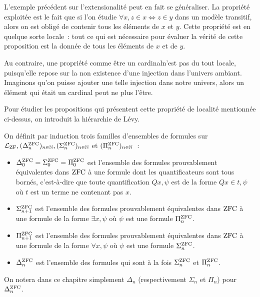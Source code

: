 L'exemple précédent sur l'extensionalité peut en fait se généraliser. La
propriété exploitée est le fait que si l'on étudie
$\forall x, z \in x \iff z \in y$ dans un modèle transitif, alors on est obligé
de contenir tous les éléments de $x$ et $y$. Cette propriété est en quelque
sorte locale~: tout ce qui est nécessaire pour évaluer la vérité de cette
proposition est la donnée de tous les éléments de $x$ et de $y$.

Au contraire, une propriété comme \og être un cardinal\fg n'est pas du tout
locale, puisqu'elle repose sur la non existence d'une injection dans l'univers
ambiant. Imaginons qu'on puisse ajouter une telle injection dans notre univers,
alors un élément qui était un cardinal peut ne plus l'être.

Pour étudier les propositions qui présentent cette propriété de localité
mentionnée ci-dessus, on introduit la hiérarchie de Lévy.

\begin{definition}
  On définit par induction trois familles d'ensembles de formules sur
  $\mathcal L_{\operatorname{ZF}}, (\Delta^{\operatorname{ZFC}}_n)_{n\in\mathbb N},
  (\Sigma^{\operatorname{ZFC}}_n)_{n\in\mathbb N}$
  et $(\Pi^{\operatorname{ZFC}}_n)_{n \in \mathbb N}$~:
  \begin{itemize}
  \item $\Delta^{\operatorname{ZFC}}_0=\Sigma^{\operatorname{ZFC}}_0=\Pi^{\operatorname{ZFC}}_0$ est l'ensemble des formules
    prouvablement équivalentes dans $\operatorname{ZFC}$ à une formule dont les
    quantificateurs sont tous bornés, c'est-à-dire que toute quantification
    $Q x, \psi$ est de la forme $Q x \in t, \psi$ où $t$ est un terme ne
    contenant pas $x$.
  \item $\Sigma^{\operatorname{ZFC}}_{n+1}$ est l'ensemble des formules prouvablement
    équivalentes
    dans $\operatorname{ZFC}$ à une formule de la forme
    $\exists x, \psi$ où $\psi$ est une formule $\Pi^{\operatorname{ZFC}}_n$.
  \item $\Pi^{\operatorname{ZFC}}_{n+1}$ est l'ensemble des formules prouvablement équivalentes
    dans $\operatorname{ZFC}$ à une formule de la forme $\forall x, \psi$ où $\psi$ est une
    formule $\Sigma^{\operatorname{ZFC}}_n$.
  \item $\Delta^{\operatorname{ZFC}}_n$ est l'ensemble des formules qui sont à la fois
    $\Sigma^{\operatorname{ZFC}}_n$ et $\Pi^{\operatorname{ZFC}}_n$.
  \end{itemize}

  On notera dans ce chapitre simplement $\Delta_n$ (respectivement $\Sigma_n$ et
  $\Pi_n$) pour $\Delta^{\operatorname{ZFC}}_n$.
\end{definition}

